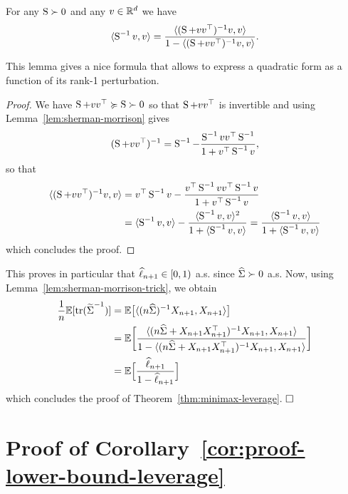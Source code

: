\begin{lemma}
	\label{lem:sherman-morrison-trick}
 	For any $\bS \succ 0$ and any $v \in \R^d$ we have
	 \begin{equation*}
	 	\inr{\bS^{-1} v, v} = \frac{\inr{(\bS + v v^\top)^{-1} v, v}}{1 - \inr{(\bS + v v^\top)^{-1} v, v}}.
	 \end{equation*}
\end{lemma}
This lemma gives a nice formula that allows to express a quadratic form as a function of its rank-1 perturbation.
\begin{proof}
	We have $\bS + v v^\top \mgeq \bS \succ 0$ so that $\bS + v v^\top$ is invertible and using Lemma~\ref{lem:sherman-morrison} gives
	\begin{equation*}
		(\bS + v v^\top)^{-1} = \bS^{-1} - \frac{\bS^{-1} v v^\top \bS^{-1}}{1 + v^\top \bS^{-1} v},
	\end{equation*}
	so that 
	\begin{align*}
		\inr{(\bS + v v^\top)^{-1} v, v} &= v^\top \bS^{-1} v - \frac{v^\top \bS^{-1} v v^\top \bS^{-1} v}{1 + v^\top \bS^{-1} v} \\
		&= \inr{\bS^{-1} v, v} - \frac{\inr{\bS^{-1} v, v}^2}{1 + \inr{\bS^{-1} v, v}} = \frac{\inr{\bS^{-1} v, v}}{1 + \inr{\bS^{-1} v, v}}
	\end{align*}
	which concludes the proof.
\end{proof}
This proves in particular that $\wh \ell_{n+1} \in [0, 1)$ a.s. since $\wh \bSigma \succ 0$ a.s.
Now, using Lemma~\ref{lem:sherman-morrison-trick}, we obtain
\begin{align*}
	\frac 1n \E [\tr( \wt \bSigma^{-1}) ] &= \E \big[ \inr{(n \wh \bSigma)^{-1} X_{n+1}, X_{n+1}} \big] \\
	&= \E \bigg[ \frac{ \inr{(n \wh \bSigma + X_{n+1} X_{n+1}^\top)^{-1} X_{n+1}, X_{n+1} }}{1 - \inr{(n \wh \bSigma + X_{n+1} X_{n+1}^\top)^{-1} X_{n+1}, X_{n+1} } } \bigg] \\
	&= \E \Big[ \frac{\wh \ell_{n+1}}{1 - \wh \ell_{n+1}} \Big]
\end{align*}
which concludes the proof of Theorem~\ref{thm:minimax-leverage}. $\hfill \square$


\section{Proof of Corollary~\ref{cor:proof-lower-bound-leverage}} %

